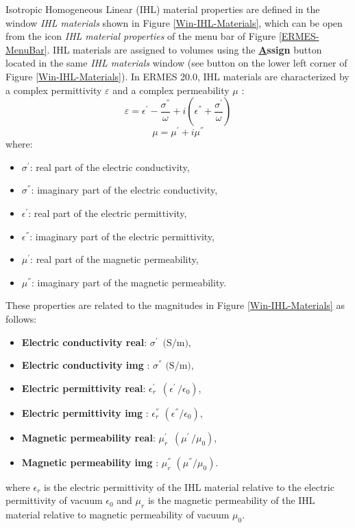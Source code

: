 Isotropic Homogeneous Linear (IHL) material properties are defined in the window \textit{IHL materials} shown in Figure \ref{Win-IHL-Materials}, which can be open from the icon \textit{IHL material properties} of the menu bar of Figure \ref{ERMES-MenuBar}. IHL materials are assigned to volumes using the \textbf{\underline{A}ssign} button located in the same \textit{IHL materials} window (see button on the lower left corner of Figure \ref{Win-IHL-Materials}). In ERMES 20.0, IHL materials are characterized by a complex permittivity $\varepsilon$ and a complex permeability $\mu$ \cite{Pozar, Jackson}:
\begin{equation}\label{ComplexPermittivityIHL}
    \varepsilon = \epsilon^{'} - \frac{\sigma^{''}}{\omega} + i\left(\epsilon^{''} + \frac{\sigma^{'}}{\omega}\right)
\end{equation}
\begin{equation}\label{ComplexPermeabiltyIHL}
    \mu = \mu^{'} + i \mu^{''}
\end{equation}
where:
\begin{itemize}\itemsep0em 
	\item $\sigma^{' }$: real part of the electric conductivity,
	\item $\sigma^{''}$: imaginary part of the electric conductivity,
    \\
	\item $\epsilon^{' }$: real part of the electric permittivity,
    \item $\epsilon^{''}$: imaginary part of the electric permittivity,
    \\
	\item $\mu^{' }$: real part of the magnetic permeability,
    \item $\mu^{''}$: imaginary part of the magnetic permeability.
\end{itemize}
These properties are related to the magnitudes in Figure \ref{Win-IHL-Materials} as follows:
\begin{itemize}\itemsep0em 
	\item \textbf{Electric conductivity real}: $\sigma^{' } \,\,\, \text{(S/m)}$,
	\item \textbf{Electric conductivity img }: $\sigma^{''} \,\,   \text{(S/m)}$,
    \\
	\item \textbf{Electric permittivity real}: $\epsilon_{r}^{' } \,\,\, (\epsilon^{' }\,/\epsilon_{0})$,
	\item \textbf{Electric permittivity img }: $\epsilon_{r}^{''} \,\,   (\epsilon^{''}/\epsilon_{0})$,
    \\
	\item \textbf{Magnetic permeability real}: $\mu_{r}^{' } \,\,\, (\mu^{' }\,/\mu_{0})$,
	\item \textbf{Magnetic permeability img }: $\mu_{r}^{''} \,\,   (\mu^{''}/\mu_{0})$.
\end{itemize}
where $\epsilon_{r}$ is the electric permittivity of the IHL material relative to the electric permittivity of vacuum $\epsilon_{0}$ and $\mu_{r}$ is the  magnetic permeability of the IHL material relative to magnetic permeability of vacuum $\mu_{0}$.

